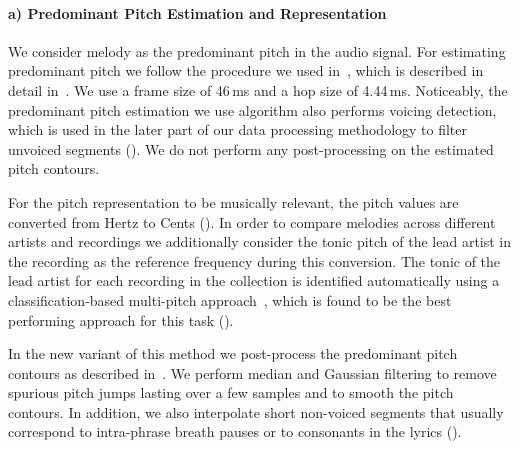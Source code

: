 \paragraph{a) Predominant Pitch Estimation and Representation} 

We consider melody as the predominant pitch in the audio signal. For estimating predominant pitch we follow the procedure we used in~, which is described in detail in~. We use a frame size of 46\,ms and a hop size of 4.44\,ms. Noticeably, the predominant pitch estimation we use algorithm also performs voicing detection, which is used in the later part of our data processing methodology to filter unvoiced segments (). We do not perform any post-processing on the estimated pitch contours.

For the pitch representation to be musically relevant, the pitch values are converted from Hertz to Cents (). In order to compare melodies across different artists and recordings we additionally consider the tonic pitch of the lead artist in the recording as the reference frequency during this conversion. The tonic of the lead artist for each recording in the collection is identified automatically using a classification-based multi-pitch approach~\citep{salamon2012multipitch}, which is found to be the best performing approach for this task ().

In the new variant of this method we post-process the predominant pitch contours as described in~. We perform median and Gaussian filtering to remove spurious pitch jumps lasting over a few samples and to smooth the pitch contours. In addition, we also interpolate short non-voiced segments that usually correspond to intra-phrase breath pauses or to consonants in the lyrics (). 



